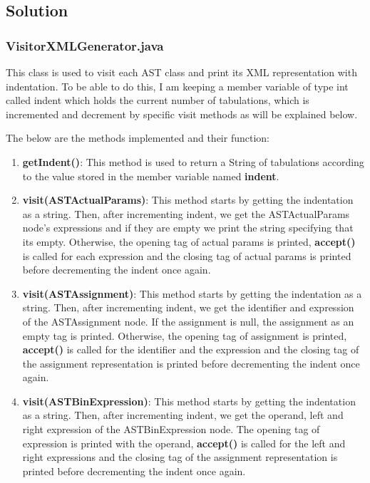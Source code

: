 \documentclass{article}
\begin{document}
				\subsection{Solution}
				\subsubsection{VisitorXMLGenerator.java}
				This class is used to visit each AST class and print its XML representation with indentation. To be able to do this, I am keeping a member variable of type int called indent which holds the current number of tabulations, which is incremented and decrement by specific visit methods as will be explained below.
				
				The below are the methods implemented and their function:
				
				\begin{enumerate}
				\item \textbf{getIndent()}: This method is used to return a String of tabulations according to the value stored in the member variable named \textbf{indent}. 
				\item \textbf{visit(ASTActualParams)}: This method starts by getting the indentation as a string. Then, after incrementing indent, we get the ASTActualParams node's expressions and if they are empty we print the string specifying that its empty. Otherwise, the opening tag of actual params is printed, \textbf{accept()} is called for each expression and the closing tag of actual params is printed before decrementing the indent once again.
				
					\item \textbf{visit(ASTAssignment)}: This method starts by getting the indentation as a string. Then, after incrementing indent, we get the identifier and expression of the ASTAssignment node. If the assignment is null, the assignment as an empty tag is printed. Otherwise, the opening tag of assignment is printed, \textbf{accept()} is called for the identifier and the expression and the closing tag of the assignment representation is printed before decrementing the indent once again.
			
					\item \textbf{visit(ASTBinExpression)}: This method starts by getting the indentation as a string. Then, after incrementing indent, we get the operand, left and right expression of the ASTBinExpression node.  The opening tag of expression is printed with the operand, \textbf{accept()} is called for the left and right expressions and the closing tag of the assignment representation is printed before decrementing the indent once again.		
			

\end{enumerate}
\end{document}
